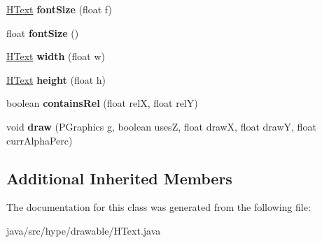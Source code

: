 \begin{DoxyCompactItemize}
\item 
\hypertarget{classhype_1_1drawable_1_1_h_text_a8972dfdc3677f1477da78d43a65c8bc9}{\hyperlink{classhype_1_1drawable_1_1_h_text}{H\-Text} {\bfseries font\-Size} (float f)}\label{classhype_1_1drawable_1_1_h_text_a8972dfdc3677f1477da78d43a65c8bc9}

\item 
\hypertarget{classhype_1_1drawable_1_1_h_text_aa0c33b11fb4c2adb4ff564fd8647df16}{float {\bfseries font\-Size} ()}\label{classhype_1_1drawable_1_1_h_text_aa0c33b11fb4c2adb4ff564fd8647df16}

\item 
\hypertarget{classhype_1_1drawable_1_1_h_text_a34d2ed02a16e5cfde7a1234c81752405}{\hyperlink{classhype_1_1drawable_1_1_h_text}{H\-Text} {\bfseries width} (float w)}\label{classhype_1_1drawable_1_1_h_text_a34d2ed02a16e5cfde7a1234c81752405}

\item 
\hypertarget{classhype_1_1drawable_1_1_h_text_aa5de72954d2566d756b8f215fec23a1b}{\hyperlink{classhype_1_1drawable_1_1_h_text}{H\-Text} {\bfseries height} (float h)}\label{classhype_1_1drawable_1_1_h_text_aa5de72954d2566d756b8f215fec23a1b}

\item 
\hypertarget{classhype_1_1drawable_1_1_h_text_a0e58a8da08b4b63657be00cbc8a317ec}{boolean {\bfseries contains\-Rel} (float rel\-X, float rel\-Y)}\label{classhype_1_1drawable_1_1_h_text_a0e58a8da08b4b63657be00cbc8a317ec}

\item 
\hypertarget{classhype_1_1drawable_1_1_h_text_a45d252ab33bf417402736b7f3c5476b8}{void {\bfseries draw} (P\-Graphics g, boolean uses\-Z, float draw\-X, float draw\-Y, float curr\-Alpha\-Perc)}\label{classhype_1_1drawable_1_1_h_text_a45d252ab33bf417402736b7f3c5476b8}

\end{DoxyCompactItemize}
\subsection*{Additional Inherited Members}


The documentation for this class was generated from the following file\-:\begin{DoxyCompactItemize}
\item 
java/src/hype/drawable/H\-Text.\-java\end{DoxyCompactItemize}
